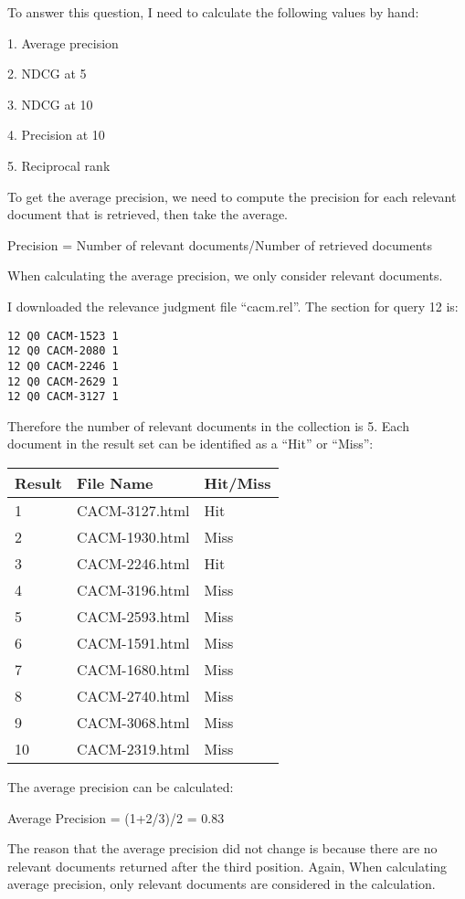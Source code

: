 To answer this question, I need to calculate the following values by hand:

1. Average precision

2. NDCG at 5 

3. NDCG at 10 

4. Precision at 10 

5. Reciprocal rank 

To get the average precision, we need to compute the precision for each relevant document that is retrieved, then take the average.

Precision = Number of relevant documents/Number of retrieved documents

When calculating the average precision, we only consider relevant documents.

I downloaded the relevance judgment file ``cacm.rel''. The section for query 12 is:

\begin{lstlisting}[breakatwhitespace=〈false)]
12 Q0 CACM-1523 1
12 Q0 CACM-2080 1
12 Q0 CACM-2246 1
12 Q0 CACM-2629 1
12 Q0 CACM-3127 1
\end{lstlisting}

Therefore the number of relevant documents in the collection is 5. Each document in the result set can be identified as a ``Hit'' or ``Miss'':

\begin{longtable}{ |p{1cm}|p{6cm}|p{6cm}| } 
\hline
Result & File Name & Hit/Miss \\
\hline
1 & CACM-3127.html & Hit \\
\hline
2 & CACM-1930.html & Miss \\
\hline
3 & CACM-2246.html & Hit \\
\hline
4 & CACM-3196.html & Miss \\
\hline
5 & CACM-2593.html & Miss \\
\hline
6 & CACM-1591.html & Miss \\
\hline
7 & CACM-1680.html & Miss \\
\hline
8 & CACM-2740.html & Miss \\
\hline
9 & CACM-3068.html & Miss \\
\hline
10 & CACM-2319.html & Miss \\
\hline
\end{longtable}


The average precision can be calculated:

Average Precision = (1+2/3)/2 = 0.83

The reason that the average precision did not change is because there are no relevant documents returned after the third position. Again, When calculating average precision, only relevant documents are considered in the calculation. 

